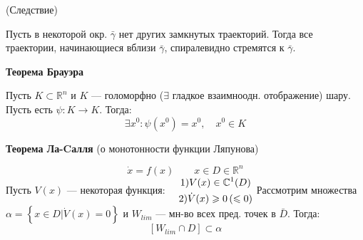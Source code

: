 	\begin{assertion} (Следствие)
	 	
			Пусть в некоторой окр. $\bar{\gamma}$ нет других замкнутых траекторий. Тогда все траектории,
			 начинающиеся вблизи $\bar{\gamma}$, спиралевидно стремятся к $\bar{\gamma}$.
	\end{assertion}

	\begin{theorem} \textbf{Теорема Брауэра}
	
		Пусть $K \subset \mathbb{R}^n$ и $K$ --- голоморфно ($\exists$  гладкое взаимноодн. отображение) 
			шару. \newline Пусть есть $\psi: K\rightarrow K$. Тогда:
		$$	
			\exists x^0: \psi(x^0) = x^0, \quad x^0\in K
		$$
	\end{theorem}
	\begin{theorem} \textbf{Теорема Ла-Cалля} (о монотонности функции Ляпунова)
	
		$$
			\dot{x} = f(x) \qquad x \in D \in \mathbb{R}^n
		$$\newline
		Пусть $V(x)$ --- некоторая функция: $\quad \begin{gathered}
																			1) V(x) \in \mathbb{C}^1(D) \\
																			2) \dot{V}(x) \geqslant 0 \, (\leqslant 0)
																		\end{gathered}\vspace{3mm}$ \newline
		Рассмотрим множества $\alpha= \left\{x \in D\Big| \dot{V}(x) = 0\right\}$ и $W_{lim}$ --- мн-во всех пред. 
																				точек в $\bar{D}.$ Тогда: 
				$$
					 [W_{lim}\cap D] \subset \alpha
				$$
	\end{theorem}
